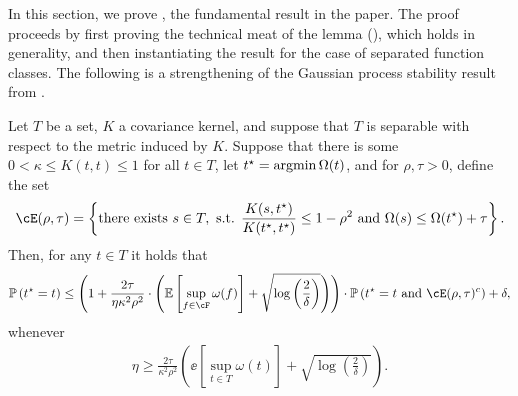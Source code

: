 In this section, we prove , the fundamental result in the paper.  The proof proceeds by first proving the technical meat of the lemma (), which holds in generality, and then instantiating the result for the case of separated function classes.  The following is a strengthening of the Gaussian process stability result from \citet{block2022smoothed,block2024oracle}.

    \begin{lemma}\label{lem:gp_stability}
        Let $T$ be a set, $K$ a covariance kernel, and suppose that $T$ is separable with respect to the metric induced by $K$.  Suppose that there is some $0 < \kappa \leq K(t,t) \leq 1$ for all $t \in T$, let $t^\star = \operatorname*{argmin} \Omega(t)$, and for $\rho, \tau > 0$, define the set 
        \begin{align}\label{eq:good_set_def}
            \cE(\rho, \tau) = \left\{ \text{there exists } s \in T, \text{ s.t. } \frac{K(s,\tstar)}{K(\tstar, \tstar)} \leq 1 - \rho^2 \text{ and } \Omega(s) \leq \Omega(\tstar) + \tau \right\}.
        \end{align}
        Then, for any $t \in T$ it holds that
        \begin{align}\label{eq:gp_stability}
            \pp\left( \tstar = t \right) \leq \left(1 + \frac{2 \tau }{ \eta \kappa^2  \rho^2}  \cdot\left( \ee\left[ \sup_{f \in \cF} \omega(f) \right] + \sqrt{\log\left( \frac 2\delta \right)}\right)\right) \cdot \pp\left( \tstar = t \text{ and } \cE(\rho, \tau)^c \right) + \delta,
        \end{align}
        whenever
        \begin{align}\label{eq:eta_lb}
            \eta \geq \frac{2\tau}{\kappa^2 \rho^2} \left( \ee\left[ \sup_{t \in T} \omega(t) \right] + \sqrt{\log\left( \frac 2\delta \right)} \right).
        \end{align}
    \end{lemma}






